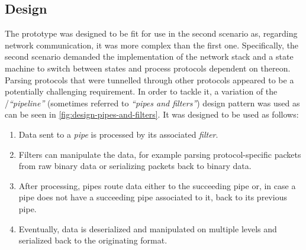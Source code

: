 \subsection{Design}
The prototype was designed to be fit for use in the second scenario as, regarding network communication, it was more complex than the first one. Specifically, the second scenario demanded the implementation of the network stack and a state machine to switch between states and process protocols dependent on thereon.\\
Parsing protocols that were tunnelled through other protocols appeared to be a potentially challenging requirement. In order to tackle it, a variation of the /\emph{\enquote{pipeline}} (sometimes referred to \emph{\enquote{pipes and filters}}) design pattern was used as can be seen in \ref{fig:design-pipes-and-filters}. It was designed to be used as follows:
\begin{enumerate}
    \item Data sent to a \emph{pipe} is processed by its associated \emph{filter}. 
    \item Filters can manipulate the data, for example parsing protocol-specific packets from raw binary data or serializing packets back to binary data.
    \item After processing, pipes route data either to the succeeding pipe or, in case a pipe does not have a succeeding pipe associated to it, back to its previous pipe.
    \item Eventually, data is deserialized and manipulated on multiple levels and serialized back to the originating format.
\end{enumerate} %

